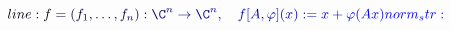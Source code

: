 \documentclass[12pt]{article}
\begin{document}
\makeatletter
\renewcommand*{\@textcolor}[3]{%
  \protect\leavevmode
  \begingroup
    \color#1{#2}#3%
  \endgroup
}
\makeatother
\begin{displaymath}
\mathcolor[RGB]{0,0,15}{line:
f} \mathcolor[RGB]{0,0,30}{=} \mathcolor[RGB]{0,0,45}{(f_1,} \mathcolor[RGB]{0,0,60}{\ldots,} \mathcolor[RGB]{0,0,75}{f_n)} \mathcolor[RGB]{0,0,90}{:} \mathcolor[RGB]{0,0,105}{\C^n} \mathcolor[RGB]{0,0,120}{\to} \mathcolor[RGB]{0,0,135}{\C^n,} \quad \mathcolor[RGB]{0,0,150}{f[A,} \mathcolor[RGB]{0,0,165}{\varphi](x)} \mathcolor[RGB]{0,0,180}{:=} \mathcolor[RGB]{0,0,195}{x} \mathcolor[RGB]{0,0,210}{+} \mathcolor[RGB]{0,0,225}{\varphi(Ax)

norm_str:}
\end{displaymath}
\end{document}
